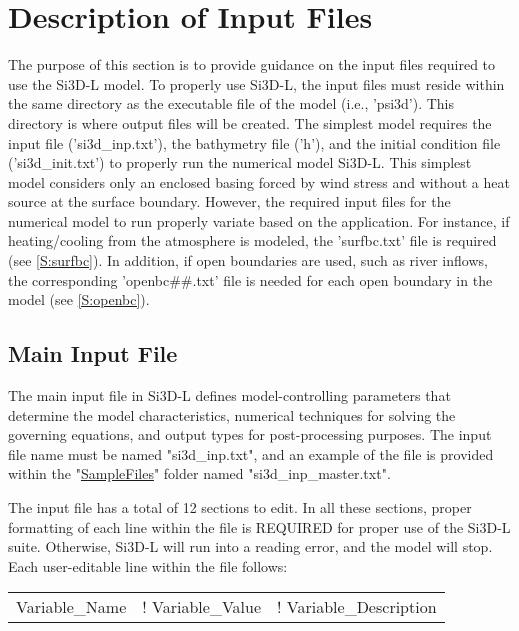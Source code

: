 \section{Description of Input Files}

The purpose of this section is to provide guidance on the input files required to use the Si3D-L model. To properly use Si3D-L, the input files must reside within the same directory as the executable file of the model (i.e., 'psi3d'). This directory is where output files will be created. The simplest model requires the input file ('si3d\_inp.txt'), the bathymetry file ('h'), and the initial condition file ('si3d\_init.txt') to properly run the numerical model Si3D-L. This simplest model considers only an enclosed basing forced by wind stress and without a heat source at the surface boundary. However, the required input files for the numerical model to run properly variate based on the application. For instance, if heating/cooling from the atmosphere is modeled, the 'surfbc.txt' file is required (see \ref{S:surfbc}). In addition, if open boundaries are used, such as river inflows, the corresponding 'openbc\#\#.txt' file is needed for each open boundary in the model (see \ref{S:openbc}).

\subsection{Main Input File}
\label{S:Main}

The main input file in Si3D-L defines model-controlling parameters that determine the model characteristics, numerical techniques for solving the governing equations, and output types for post-processing purposes. The input file name must be named "si3d\_inp.txt", and an example of the file is provided within the "\href{https://github.com/SI3DL/psi3d/tree/main/SampleFiles}{SampleFiles}" folder named "si3d\_inp\_master.txt". 

The input file has a total of 12 sections to edit. In all these sections, proper formatting of each line within the file is REQUIRED for proper use of the Si3D-L suite. Otherwise, Si3D-L will run into a reading error, and the model will stop. Each user-editable line within the file follows:

\begin{table}[h]
    \centering
    \begin{tabular}{c c c}
        Variable\_Name & ! Variable\_Value & ! Variable\_Description
    \end{tabular}
    \label{tab:inputformat}
\end{table}


